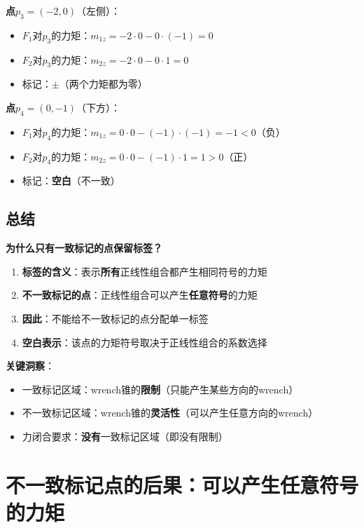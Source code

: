 \documentclass[12pt,a4paper]{article}
\begin{document}
\textbf{点$p_3 = (-2, 0)$}（左侧）：
\begin{itemize}
\item $F_1$对$p_3$的力矩：$m_{1z} = -2 \cdot 0 - 0 \cdot (-1) = 0$
\item $F_2$对$p_3$的力矩：$m_{2z} = -2 \cdot 0 - 0 \cdot 1 = 0$
\item 标记：$\pm$（两个力矩都为零）
\end{itemize}

\textbf{点$p_4 = (0, -1)$}（下方）：
\begin{itemize}
\item $F_1$对$p_4$的力矩：$m_{1z} = 0 \cdot 0 - (-1) \cdot (-1) = -1 < 0$（负）
\item $F_2$对$p_4$的力矩：$m_{2z} = 0 \cdot 0 - (-1) \cdot 1 = 1 > 0$（正）
\item 标记：\textbf{空白}（不一致）
\end{itemize}

\subsection{总结}

\textbf{为什么只有一致标记的点保留标签？}

\begin{enumerate}
\item \textbf{标签的含义}：表示\textbf{所有}正线性组合都产生相同符号的力矩
\item \textbf{不一致标记的点}：正线性组合可以产生\textbf{任意符号}的力矩
\item \textbf{因此}：不能给不一致标记的点分配单一标签
\item \textbf{空白表示}：该点的力矩符号取决于正线性组合的系数选择
\end{enumerate}

\textbf{关键洞察}：
\begin{itemize}
\item 一致标记区域：wrench锥的\textbf{限制}（只能产生某些方向的wrench）
\item 不一致标记区域：wrench锥的\textbf{灵活性}（可以产生任意方向的wrench）
\item 力闭合要求：\textbf{没有}一致标记区域（即没有限制）
\end{itemize}

\section{不一致标记点的后果：可以产生任意符号的力矩}
\end{document}
